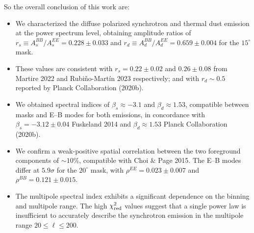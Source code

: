 \documentclass[12pt,a4paper]{article}
\begin{document}
So the overall conclusion of this work are:

\begin{itemize}
    \item We characterized the diffuse polarized synchrotron and thermal dust emission at the power spectrum level, obtaining amplitude ratios of $r_s \equiv A_s^{BB}/A_s^{EE} = 0.228 \pm 0.033$ and $r_d \equiv A_d^{BB}/A_d^{EE} = 0.659 \pm 0.004$ for the $15^{\circ}$ mask.

    \item These values are consistent with $r_s=0.22\pm0.02$ and $0.26\pm0.08$ from Martire 2022 and Rubiño-Martín 2023 respectively; and with $r_d\sim0.5$ reported by Planck Collaboration (2020b).

    \item We obtained spectral indices of $\beta_s\approx-3.1$ and $\beta_d\approx1.53$, compatible between masks and E--B modes for both emissions, in concordance with $\beta_s=-3.12\pm0.04$ Fuskeland 2014 and $\beta_d\approx1.53$ Planck Collaboration (2020b).

    \item We confirm a weak-positive spatial correlation between the two foreground components of $\sim10\%$, compatible with Choi $\&$ Page 2015. The E--B modes differ at $5.9\sigma$ for the $20^{\circ}$ mask, with $\rho^{EE}=0.023\pm0.007$ and $\rho^{BB}=0.121\pm0.015$.

    \item The multipole spectral index exhibits a significant dependence on the binning and multipole range. The high $\chi^2_{\rm red}$ values suggest that a single power law is insufficient to accurately describe the synchrotron emission in the multipole range $20\leq \ell \leq 200$.
\end{itemize}
\end{document}
